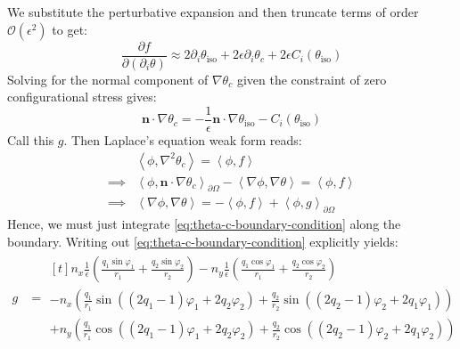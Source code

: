 \documentclass[reqno]{article}
\begin{document}
We substitute the perturbative expansion and then truncate terms of order $\mathcal{O}(\epsilon^2)$ to get:
\begin{equation}
    \frac{\partial f}{\partial (\partial_i \theta)}
    \approx
    2 \partial_i \theta_\text{iso}
    + 2 \epsilon \partial_i \theta_c
    + 2 \epsilon C_i(\theta_\text{iso})
\end{equation}
Solving for the normal component of $\nabla \theta_c$ given the constraint of zero configurational stress gives:
\begin{equation} \label{eq:theta-c-boundary-condition}
    \mathbf{n} \cdot \nabla \theta_c
    =
    -\frac{1}{\epsilon} \mathbf{n} \cdot \nabla \theta_\text{iso}
    - C_i(\theta_\text{iso})
\end{equation}
Call this $g$.
Then Laplace's equation weak form reads:
\begin{equation}
\begin{split}
    &\left<\phi, \nabla^2 \theta_c\right>
    =
    \left<\phi, f\right> \\
    \implies
    &\left<\phi, \mathbf{n} \cdot \nabla \theta_c \right>_{\partial \Omega}
    - \left<\nabla \phi, \nabla \theta \right>
    =
    \left<\phi, f\right> \\
    \implies
    &\left<\nabla \phi, \nabla \theta\right>
    =
    -\left<\phi, f\right>
    + \left<\phi, g \right>_{\partial \Omega}
\end{split}
\end{equation}
Hence, we must just integrate \eqref{eq:theta-c-boundary-condition} along the boundary.
Writing out \eqref{eq:theta-c-boundary-condition} explicitly yields:
\begin{equation}
\begin{split}
    g
    &=
    \begin{multlined}[t]
    n_x \frac{1}{\epsilon} \left(
        \frac{q_1 \sin\varphi_1}{r_1}
        + \frac{q_2 \sin\varphi_2}{r_2}
    \right)
    - n_y \frac{1}{\epsilon} \left(
        \frac{q_1 \cos\varphi_1}{r_1}
        + \frac{q_2 \cos\varphi_2}{r_2}
    \right) \\
    - n_x \left(
        \frac{q_1}{r_1} \sin((2 q_1 - 1)\varphi_1 + 2 q_2 \varphi_2)
        + \frac{q_2}{r_2} \sin((2 q_2 - 1)\varphi_2 + 2 q_1 \varphi_1)
    \right) \\
    + n_y \left(
        \frac{q_1}{r_1} \cos((2 q_1 - 1)\varphi_1 + 2q_2 \varphi_2)
        + \frac{q_2}{r_2} \cos((2 q_2 - 1)\varphi_2 + 2 q_1 \varphi_2)
    \right)
    \end{multlined}
\end{split}
\end{equation}
\end{document}
